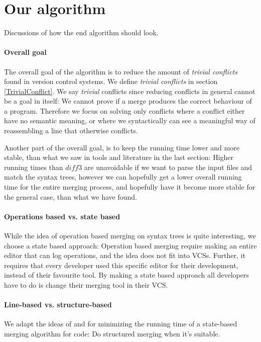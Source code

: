 \documentclass[11pt]{article}
\begin{document}
\section{Our algorithm}
Discussions of how the end algorithm should look.

\paragraph{Overall goal} The overall goal of the algorithm is to reduce the amount of \textit{trivial conflicts} found in version control systems. We define \textit{trivial conflicts} in section \ref{TrivialConflict}. We say \textit{trivial} conflicts since reducing conflicts in general cannot be a goal in itself: We cannot prove if a merge produces the correct behaviour of a program. Therefore we focus on solving only conflicts where a conflict either have no semantic meaning, or where we syntactically can see a meaningful way of reassembling a line that otherwise conflicts.


Another part of the overall goal, is to keep the running time lower and more stable, than what we saw in tools and literature in the last section: Higher running times than $diff3$ are unavoidable if we want to parse the input files and match the syntax trees, however we can hopefully get a lower overall running time for the entire merging process, and hopefully have it become more stable for the general case, than what we have found.

\paragraph{Operations based vs. state based} While the idea of operation based merging on syntax trees is quite interesting, we choose a state based approach: Operation based merging require making an entire editor that can log operations, and the idea does not fit into VCSs. Further, it requires that every developer used this specific editor for their development, instead of their favourite tool. By making a state based approach all developers have to do is change their merging tool in their VCS.

\paragraph{Line-based vs. structure-based} We adapt the ideas of \citet{Olav} and \citet{Apel} for minimizing the running time of a state-based merging algorithm for code: Do structured merging when it's suitable.
\end{document}
